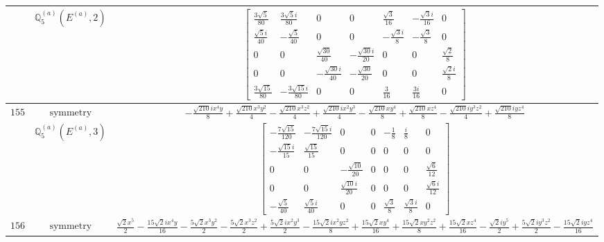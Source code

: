 \documentclass[fleqn,8pt,landscape]{jsarticle}
\begin{document}
\begin{longtable}{ccc}
$  $ & $ \mathbb{Q}_{5}^{(a)}(E^{(a)},2) $ & $ \begin{bmatrix} \frac{3 \sqrt{5}}{80} & \frac{3 \sqrt{5} i}{80} & 0 & 0 & \frac{\sqrt{3}}{16} & - \frac{\sqrt{3} i}{16} & 0 \\ \frac{\sqrt{5} i}{40} & - \frac{\sqrt{5}}{40} & 0 & 0 & - \frac{\sqrt{3} i}{8} & - \frac{\sqrt{3}}{8} & 0 \\ 0 & 0 & \frac{\sqrt{30}}{40} & - \frac{\sqrt{30} i}{20} & 0 & 0 & \frac{\sqrt{2}}{8} \\ 0 & 0 & - \frac{\sqrt{30} i}{40} & - \frac{\sqrt{30}}{20} & 0 & 0 & \frac{\sqrt{2} i}{8} \\ \frac{3 \sqrt{15}}{80} & - \frac{3 \sqrt{15} i}{80} & 0 & 0 & \frac{3}{16} & \frac{3 i}{16} & 0 \end{bmatrix} $ \\ \hline
$ 155 $ & $ \text{symmetry} $ & $ - \frac{\sqrt{210} i x^{4} y}{8} + \frac{\sqrt{210} x^{3} y^{2}}{4} - \frac{\sqrt{210} x^{3} z^{2}}{4} + \frac{\sqrt{210} i x^{2} y^{3}}{4} - \frac{\sqrt{210} x y^{4}}{8} + \frac{\sqrt{210} x z^{4}}{8} - \frac{\sqrt{210} i y^{3} z^{2}}{4} + \frac{\sqrt{210} i y z^{4}}{8} $ \\
$  $ & $ \mathbb{Q}_{5}^{(a)}(E^{(a)},3) $ & $ \begin{bmatrix} - \frac{7 \sqrt{15}}{120} & - \frac{7 \sqrt{15} i}{120} & 0 & 0 & - \frac{1}{8} & \frac{i}{8} & 0 \\ - \frac{\sqrt{15} i}{15} & \frac{\sqrt{15}}{15} & 0 & 0 & 0 & 0 & 0 \\ 0 & 0 & - \frac{\sqrt{10}}{20} & 0 & 0 & 0 & \frac{\sqrt{6}}{12} \\ 0 & 0 & \frac{\sqrt{10} i}{20} & 0 & 0 & 0 & \frac{\sqrt{6} i}{12} \\ - \frac{\sqrt{5}}{40} & \frac{\sqrt{5} i}{40} & 0 & 0 & \frac{\sqrt{3}}{8} & \frac{\sqrt{3} i}{8} & 0 \end{bmatrix} $ \\ \hline
$ 156 $ & $ \text{symmetry} $ & $ \frac{\sqrt{2} x^{5}}{2} - \frac{15 \sqrt{2} i x^{4} y}{16} - \frac{5 \sqrt{2} x^{3} y^{2}}{2} - \frac{5 \sqrt{2} x^{3} z^{2}}{2} + \frac{5 \sqrt{2} i x^{2} y^{3}}{2} - \frac{15 \sqrt{2} i x^{2} y z^{2}}{8} + \frac{15 \sqrt{2} x y^{4}}{16} + \frac{15 \sqrt{2} x y^{2} z^{2}}{8} + \frac{15 \sqrt{2} x z^{4}}{16} - \frac{\sqrt{2} i y^{5}}{2} + \frac{5 \sqrt{2} i y^{3} z^{2}}{2} - \frac{15 \sqrt{2} i y z^{4}}{16} $ \\

\end{longtable}
\end{document}
